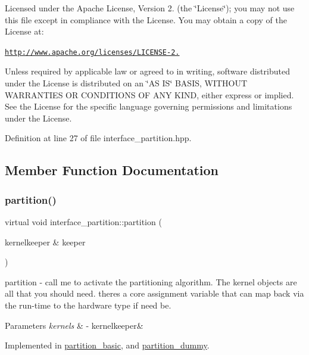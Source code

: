 Licensed under the Apache License, Version 2. (the \char`\"{}\+License\char`\"{}); you may not use this file except in compliance with the License. You may obtain a copy of the License at\+:

\href{http://www.apache.org/licenses/LICENSE-2.0}{\tt http\+://www.\+apache.\+org/licenses/\+L\+I\+C\+E\+N\+S\+E-\/2.}

Unless required by applicable law or agreed to in writing, software distributed under the License is distributed on an \char`\"{}\+A\+S I\+S\char`\"{} B\+A\+S\+IS, W\+I\+T\+H\+O\+UT W\+A\+R\+R\+A\+N\+T\+I\+ES OR C\+O\+N\+D\+I\+T\+I\+O\+NS OF A\+NY K\+I\+ND, either express or implied. See the License for the specific language governing permissions and limitations under the License. 

Definition at line 27 of file interface\+\_\+partition.\+hpp.



\subsection{Member Function Documentation}
\hypertarget{classinterface__partition_a7161f6277517624347fda38c8ffa019d}{}\label{classinterface__partition_a7161f6277517624347fda38c8ffa019d} 
\subsubsection{\texorpdfstring{partition()}{partition()}}
{\footnotesize\ttfamily virtual void interface\+\_\+partition\+::partition (\begin{DoxyParamCaption}\item[{kernelkeeper \&}]{keeper }\end{DoxyParamCaption})\hspace{0.3cm}{\ttfamily [pure virtual]}}

partition -\/ call me to activate the partitioning algorithm. The kernel objects are all that you should need. there\textquotesingle{}s a core assignment variable that can map back via the run-\/time to the hardware type if need be. 
\begin{DoxyParams}{Parameters}
{\em kernels} & -\/ kernelkeeper\& \\
\hline
\end{DoxyParams}


Implemented in \hyperlink{classpartition__basic_a3dc4106326788887f9a7c6ac49bb46d4}{partition\+\_\+basic}, and \hyperlink{classpartition__dummy_ae40e5fa9d982e718f399fe3244435e7a}{partition\+\_\+dummy}.

